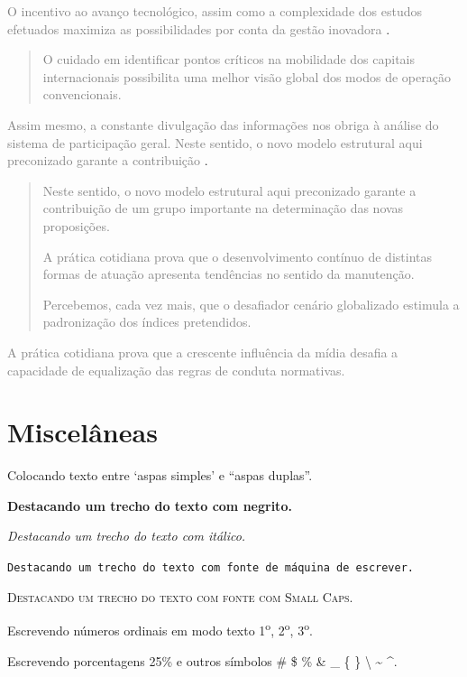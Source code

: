 \textcolor{gray}{O incentivo ao avanço tecnológico, assim como a complexidade
dos estudos efetuados maximiza as possibilidades por conta da gestão inovadora}
\textcite[10]{burden2010numerical}.
\begin{quote}
  \textcolor{gray}{O cuidado em identificar pontos críticos na mobilidade
  dos capitais internacionais possibilita uma melhor visão global dos modos
  de operação convencionais.}
\end{quote}
\textcolor{gray}{Assim mesmo, a constante divulgação das informações nos
obriga à análise do sistema de participação geral. Neste sentido, o novo
modelo estrutural aqui preconizado garante a contribuição}
\textcite[10]{burden2010numerical}.
\begin{quotation}
  \textcolor{gray}{Neste sentido, o novo modelo estrutural aqui preconizado
  garante a contribuição de um grupo importante na determinação das novas
  proposições.}

  \textcolor{gray}{A prática cotidiana prova que o desenvolvimento contínuo
  de distintas formas de atuação apresenta tendências no sentido da manutenção.}

  \textcolor{gray}{Percebemos, cada vez mais, que o desafiador cenário
  globalizado estimula a padronização dos índices pretendidos.}
\end{quotation}

\textcolor{gray}{A prática cotidiana prova que a crescente influência da
mídia desafia a capacidade de equalização das regras de conduta normativas.}

\section{Miscelâneas}
\label{sec:Miscelaneas}

Colocando texto entre `aspas simples' e ``aspas duplas''.

\textbf{Destacando um trecho do texto com negrito.}

\textit{Destacando um trecho do texto com itálico.}

\texttt{Destacando um trecho do texto com fonte de máquina de escrever.}

\textsc{Destacando um trecho do texto com fonte com Small Caps.}

Escrevendo números ordinais em modo texto
1\textsuperscript{o},
2\textsuperscript{o},
3\textsuperscript{o}.

Escrevendo porcentagens 25\%
e outros símbolos
\#
\$
\%
\&
\_
\{
\}
\textbackslash
\textasciitilde
\textasciicircum.

